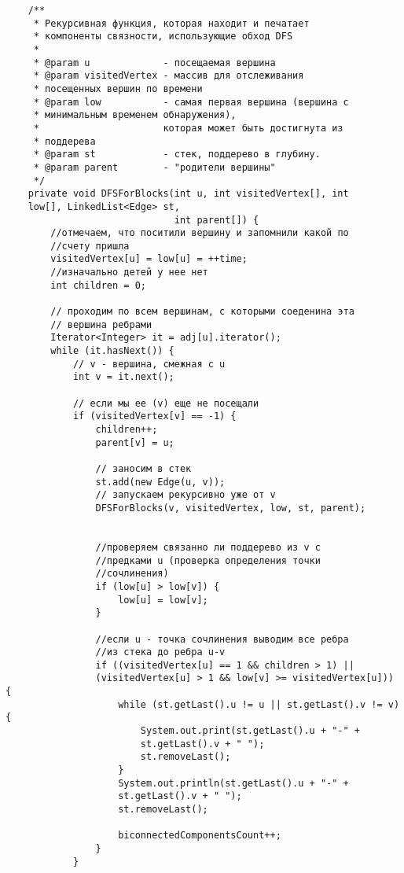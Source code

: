\begin{verbatim}
    /**
     * Рекурсивная функция, которая находит и печатает
     * компоненты связности, использующие обход DFS
     *
     * @param u             - посещаемая вершина
     * @param visitedVertex - массив для отслеживания
     * посещенных вершин по времени
     * @param low           - самая первая вершина (вершина с
     * минимальным временем обнаружения),
     *                      которая может быть достигнута из
     * поддерева
     * @param st            - стек, поддерево в глубину.
     * @param parent        - "родители вершины"
     */
    private void DFSForBlocks(int u, int visitedVertex[], int
    low[], LinkedList<Edge> st,
                              int parent[]) {
        //отмечаем, что поситили вершину и запомнили какой по
        //счету пришла
        visitedVertex[u] = low[u] = ++time;
        //изначально детей у нее нет
        int children = 0;

        // проходим по всем вершинам, с которыми соеденина эта
        // вершина ребрами
        Iterator<Integer> it = adj[u].iterator();
        while (it.hasNext()) {
            // v - вершина, смежная с u
            int v = it.next();

            // если мы ее (v) еще не посещали
            if (visitedVertex[v] == -1) {
                children++;
                parent[v] = u;

                // заносим в стек
                st.add(new Edge(u, v));
                // запускаем рекурсивно уже от v
                DFSForBlocks(v, visitedVertex, low, st, parent);


                //проверяем связанно ли поддерево из v с
                //предками u (проверка определения точки
                //сочлинения)
                if (low[u] > low[v]) {
                    low[u] = low[v];
                }

                //если u - точка сочлинения выводим все ребра
                //из стека до ребра u-v
                if ((visitedVertex[u] == 1 && children > 1) ||
                (visitedVertex[u] > 1 && low[v] >= visitedVertex[u])) {
                    while (st.getLast().u != u || st.getLast().v != v) {
                        System.out.print(st.getLast().u + "-" +
                        st.getLast().v + " ");
                        st.removeLast();
                    }
                    System.out.println(st.getLast().u + "-" +
                    st.getLast().v + " ");
                    st.removeLast();

                    biconnectedComponentsCount++;
                }
            }


\end{verbatim}
